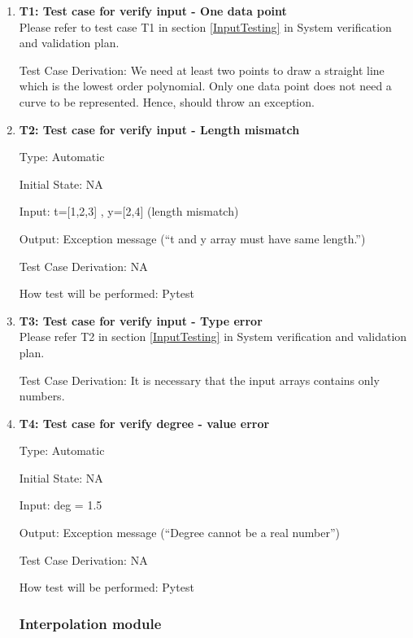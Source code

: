 \documentclass[12pt, titlepage]{article}
\begin{document}
\begin{enumerate}

\item{\textbf{T1: Test case for verify input - One data point}}\\
Please refer to test case T1 in section \ref{InputTesting} in System 
verification and validation plan.
				
Test Case Derivation: We need at least two points to draw a straight line which 
is the lowest order polynomial. Only one data point does not need a curve to be 
represented. Hence, \famname{} should throw an exception.


					
\item{\textbf{T2: Test case for verify input - Length mismatch}}

Type: Automatic
					
Initial State: NA 
					
Input: t=[1,2,3] , y=[2,4] (length mismatch)
					
Output: Exception message (``t and y array must have same length.'')

Test Case Derivation: NA

How test will be performed: Pytest


\item{\textbf{T3: Test case for verify input - Type error}}\\
Please refer T2 in section \ref{InputTesting} in System verification and 
validation plan.
					

Test Case Derivation: It is necessary that the input arrays contains only 
numbers.



\item{\textbf{T4: Test case for verify degree - value error}}

Type: Automatic

Initial State: NA 

Input: deg = 1.5 

Output: Exception message (``Degree cannot be a real number'')

Test Case Derivation: NA

How test will be performed: Pytest


    
\subsubsection{Interpolation module}


\end{enumerate}
\end{document}
